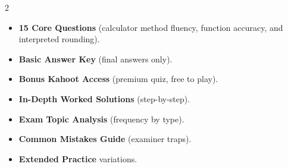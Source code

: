 \documentclass[11pt,a4paper]{article}
\newcommand{\FullReleaseDate}{April 30, 2026}
\begin{document}
\vspace{8pt}

\begin{multicols}{2}
  \begin{tcolorbox}[card, title=\sffamily\bfseries\textcolor{white}{\faHandPointDown\ TODAY (Simplified Version)}, colbacktitle=mainblue, boxed title style={sharp corners, boxrule=0pt}]
    \begin{itemize}[leftmargin=1.2em, itemsep=2pt]
      \item \small \textbf{15 Core Questions} (calculator method fluency, function accuracy, and interpreted rounding).
      \item \small \textbf{Basic Answer Key} (final answers only).
      \item \small \textbf{Bonus Kahoot Access} (premium quiz, free to play).
    \end{itemize}
  \end{tcolorbox}

  \columnbreak

  \begin{tcolorbox}[card, title=\sffamily\bfseries\textcolor{white}{\faRocket\ ON \FullReleaseDate\ (Full Upgrade)}, colbacktitle=mainblue, boxed title style={sharp corners, boxrule=0pt}]
    \begin{itemize}[leftmargin=1.2em, itemsep=2pt]
      \item \small \textbf{In-Depth Worked Solutions} (step-by-step).
      \item \small \textbf{Exam Topic Analysis} (frequency by type).
      \item \small \textbf{Common Mistakes Guide} (examiner traps).
      \item \small \textbf{Extended Practice} variations.
    \end{itemize}
  \end{tcolorbox}
\end{multicols}
\end{document}
